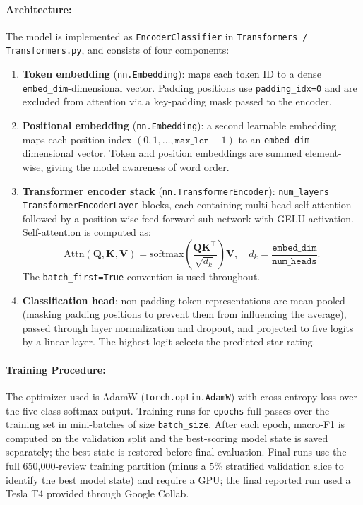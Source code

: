 \documentclass[12pt]{article}
\begin{document}
\paragraph{Architecture:}
The model is implemented as \texttt{EncoderClassifier} in \texttt{Transformers / Transformers.py}, and consists of four components:
\begin{enumerate}
    \item \textbf{Token embedding} (\texttt{nn.Embedding}): maps each token ID to a dense \texttt{embed\_dim}-dimensional vector. Padding positions use \texttt{padding\_idx=0} and are excluded from attention via a key-padding mask passed to the encoder.
    \item \textbf{Positional embedding} (\texttt{nn.Embedding}): a second learnable embedding maps each position index $(0, 1, \ldots, \texttt{max\_len}-1)$ to an \texttt{embed\_dim}-dimensional vector. Token and position embeddings are summed element-wise, giving the model awareness of word order.
    \item \textbf{Transformer encoder stack} (\texttt{nn.TransformerEncoder}): \texttt{num\_layers} \texttt{TransformerEncoderLayer} blocks, each containing multi-head self-attention followed by a position-wise feed-forward sub-network with GELU activation. Self-attention is computed as:
    \[
    \text{Attn}(\mathbf{Q},\mathbf{K},\mathbf{V}) =
    \text{softmax}\!\left(\frac{\mathbf{Q}\mathbf{K}^\top}{\sqrt{d_k}}\right)\mathbf{V},
    \quad d_k = \frac{\texttt{embed\_dim}}{\texttt{num\_heads}}.
    \]
    The \texttt{batch\_first=True} convention is used throughout.
    \item \textbf{Classification head}: non-padding token representations are mean-pooled (masking padding positions to prevent them from influencing the average), passed through layer normalization and dropout, and projected to five logits by a linear layer. The highest logit selects the predicted star rating.
\end{enumerate}
 
\paragraph{Training Procedure:}
The optimizer used is AdamW (\texttt{torch.optim.AdamW}) with cross-entropy loss over the five-class softmax output. Training runs for \texttt{epochs} full passes over the training set in mini-batches of size \texttt{batch\_size}. After each epoch, macro-F1 is computed on the validation split and the best-scoring model state is saved separately; the best state is restored before final evaluation. Final runs use the full 650,000-review training partition (minus a 5\% stratified validation slice to identify the best model state) and require a GPU; the final reported run used a Tesla T4 provided through Google Collab.
 
\end{document}
